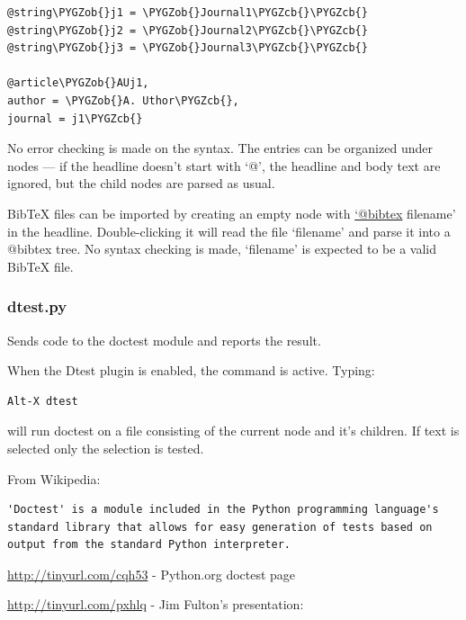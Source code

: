 \documentclass[a4paper,10pt,english]{sphinxmanual}
\def\PYGZob{\char`\{}
\def\PYGZcb{\char`\}}
\begin{document}
\begin{Verbatim}[commandchars=\\\{\}]
@string\PYGZob{}j1 = \PYGZob{}Journal1\PYGZcb{}\PYGZcb{}
@string\PYGZob{}j2 = \PYGZob{}Journal2\PYGZcb{}\PYGZcb{}
@string\PYGZob{}j3 = \PYGZob{}Journal3\PYGZcb{}\PYGZcb{}

@article\PYGZob{}AUj1,
author = \PYGZob{}A. Uthor\PYGZcb{},
journal = j1\PYGZcb{}
\end{Verbatim}

No error checking is made on the syntax. The entries can be organized under
nodes --- if the headline doesn't start with `@', the headline and body text are
ignored, but the child nodes are parsed as usual.

BibTeX files can be imported by creating an empty node with \href{mailto:'@bibtex}{`@bibtex} filename'
in the headline. Double-clicking it will read the file `filename' and parse it
into a @bibtex tree. No syntax checking is made, `filename' is expected to be a
valid BibTeX file.


\subsubsection{dtest.py}
\label{plugins:dtest-py}
Sends code to the doctest module and reports the result.

When the Dtest plugin is enabled, the  command is active.
Typing:

\begin{Verbatim}[commandchars=\\\{\}]
Alt-X dtest
\end{Verbatim}

will run doctest on a file consisting of the current node and it's children.
If text is selected only the selection is tested.

From Wikipedia:

\begin{Verbatim}[commandchars=\\\{\}]
'Doctest' is a module included in the Python programming language's
standard library that allows for easy generation of tests based on
output from the standard Python interpreter.
\end{Verbatim}

\href{http://tinyurl.com/cqh53}{http://tinyurl.com/cqh53} - Python.org doctest page

\href{http://tinyurl.com/pxhlq}{http://tinyurl.com/pxhlq} - Jim Fulton's presentation:
\end{document}
